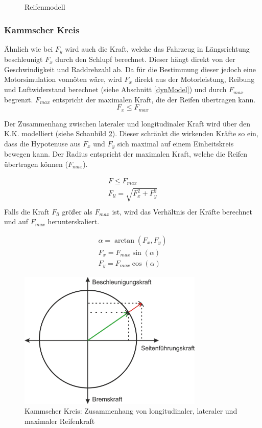 \documentclass{like}
\begin{document}
\begin{figure}[ht!]
	\centering
	 
	\caption{Reifenmodell}
	\label{fig:pacejka}
\end{figure}

\subsubsection*{Kammscher Kreis}

Ähnlich wie bei \(F_y\) wird auch die Kraft, welche das Fahrzeug in Längsrichtung beschleunigt \(F_x\) durch den Schlupf berechnet. Dieser hängt direkt von der Geschwindigkeit und Raddrehzahl ab. 
Da für die Bestimmung dieser jedoch eine Motorsimulation vonnöten wäre, wird \(F_x\) direkt aus der Motorleistung, Reibung und Luftwiderstand berechnet (siehe Abschnitt \ref{dynModel}) und durch \(F_{max}\) begrenzt. \(F_{max}\) entspricht der maximalen Kraft, die der Reifen übertragen kann.\\
\begin{equation}
F_x \leq F_{max}
\end{equation}

Der Zusammenhang zwischen lateraler und longitudinaler Kraft wird über den \ac{K.K.} modelliert (siehe Schaubild \ref{fig:kamKreis}). Dieser schränkt die wirkenden Kräfte so ein, dass die Hypotenuse aus \(F_x\) und \(F_y\) sich maximal auf einem Einheitskreis bewegen kann. Der Radius entspricht der maximalen Kraft, welche die Reifen übertragen können (\(F_{max}\)).

\begin{eqnarray}
F \leq F_{max} \\
F_{ll} = \sqrt{F_x^2 + F_y^2}  \\
\end{eqnarray}
Falls die Kraft $F_{ll}$ größer als $F_{max}$ ist, wird das Verhältnis der Kräfte berechnet und auf $F_{max}$ herunterskaliert.

\begin{eqnarray}
\alpha = \arctan(F_x, F_y)\\
F_x = F_{max} \sin(\alpha)\\
F_y = F_{max} \cos(\alpha)
\end{eqnarray}

\begin{figure}[ht!]
	\centering
	\includegraphics[width=250pt]{Abbildungen/kamKreis.png}
	\caption{Kammscher Kreis: Zusammenhang von longitudinaler, lateraler und maximaler Reifenkraft}
	\label{fig:kamKreis}
\end{figure}
\end{document}
